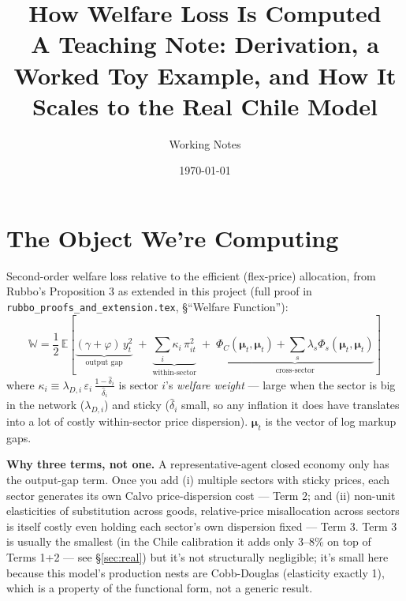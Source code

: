 \documentclass[12pt]{article}
\title{How Welfare Loss Is Computed \\ \large A Teaching Note: Derivation, a Worked Toy Example, and How It Scales to the Real Chile Model}
\author{Working Notes}
\date{\today}
\begin{document}
\maketitle
\tableofcontents
\newpage

\section{The Object We're Computing}

Second-order welfare loss relative to the efficient (flex-price) allocation, from Rubbo's
Proposition 3 as extended in this project (full proof in
\texttt{rubbo\_proofs\_and\_extension.tex}, \S``Welfare Function''):
\begin{equation}
    \mathbb{W} = \frac{1}{2}\,\mathbb{E}\left[\underbrace{(\gamma+\varphi)\,y_t^2}_{\text{output gap}}
    \;+\; \underbrace{\sum_i \kappa_i\, \pi_{it}^2}_{\text{within-sector}}
    \;+\; \underbrace{\Phi_C(\bm\mu_t,\bm\mu_t) + \sum_s\lambda_s\Phi_s(\bm\mu_t,\bm\mu_t)}_{\text{cross-sector}}\right]
    \label{eq:welfare}
\end{equation}
where $\kappa_i \equiv \lambda_{D,i}\,\varepsilon_i\,\frac{1-\hat\delta_i}{\hat\delta_i}$ is sector
$i$'s \emph{welfare weight} — large when the sector is big in the network ($\lambda_{D,i}$) and
sticky ($\hat\delta_i$ small, so any inflation it does have translates into a lot of costly
within-sector price dispersion). $\bm\mu_t$ is the vector of log markup gaps.

\begin{insight}
\textbf{Why three terms, not one.} A representative-agent closed economy only has the output-gap
term. Once you add (i) multiple sectors with sticky prices, each sector generates its own
Calvo price-dispersion cost — Term 2; and (ii) non-unit elasticities of substitution across
goods, relative-price misallocation across sectors is itself costly even holding each sector's own
dispersion fixed — Term 3. Term 3 is usually the smallest (in the Chile calibration it adds only
3--8\% on top of Terms 1+2 — see \S\ref{sec:real}) but it's not structurally negligible; it's small
here because this model's production nests are Cobb-Douglas (elasticity exactly 1), which is a
property of the functional form, not a generic result.
\end{insight}
\end{document}
